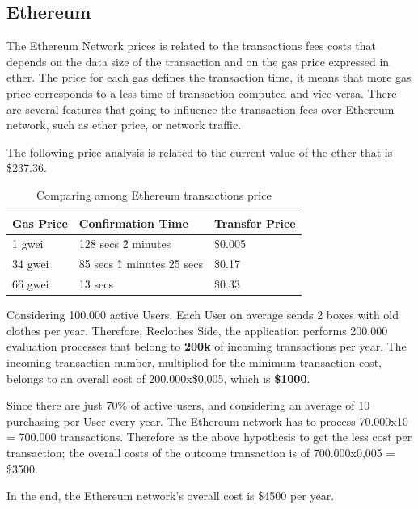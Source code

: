 \subsection{Ethereum}

The Ethereum Network prices is related to the transactions fees costs that depends on the data size 
of the transaction and on the gas price expressed in ether. The price for each gas defines
the transaction time, it means that more gas price corresponds to a less time of transaction computed 
and vice-versa. There are several features that going to influence the transaction fees over Ethereum 
network, such as ether price, or network traffic. 

The following price analysis is related to the current value of the ether that is \$237.36.\cite{gastracker} \cite{ethgasstation}

\begin{table}[h]
    {\renewcommand\arraystretch{1.25}
    \begin{tabular}{|l|l|l|} \hline
    \textbf{Gas Price} & \textbf{Confirmation Time} & \textbf{Transfer Price}\\ \hline\hline
    1 gwei & 128 secs \~ 2 minutes & \$0.005 \\ \hline
    34 gwei & 85 secs \~ 1 minutes 25 secs & \$0.17\\ \hline
    66 gwei & 13 secs & \$0.33\\ \hline
    \end{tabular}}
    \caption{Comparing among Ethereum transactions price}
    \label{table-compare-eth-price}
\end{table}

Considering 100.000 active Users. Each User on average sends 2 boxes with old clothes per year.
Therefore, Reclothes Side, the application performs 200.000 evaluation processes that belong to \textbf{200k} 
of incoming transactions per year. The incoming transaction number, multiplied for the minimum transaction cost, 
belongs to an overall cost of 200.000x\$0,005, which is \textbf{\$1000}.

Since there are just 70\% of active users, and considering an average of 10 purchasing per User every year. The 
Ethereum network has to process 70.000x10 = 700.000 transactions. Therefore as the above hypothesis to get the 
less cost per transaction; the overall costs of the outcome transaction is of 700.000x0,005 = \$3500.

In the end, the Ethereum network's overall cost is \$4500 per year. 

